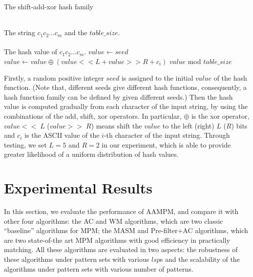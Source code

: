 \documentclass{article}
\begin{document}


\begin{algorithm}
  \caption{The \textsf{shift-add-xor} hash family}\scriptsize
  \label{alg:hash fun}
  \begin{algorithmic}[1]
    \REQUIRE ~~\\
    The string $c_1c_2 \dots c_m$ and the $table\_size$.  \\
    \ENSURE ~~\\
    The hash value of $c_1c_2 \dots c_m$.
    \STATE
    \STATE $value \leftarrow seed$
    \STATE $value \leftarrow value \oplus (value << L + value >> R + c_i)$
    \ENDFOR
    \RETURN $value$ mod $table\_size$
  \end{algorithmic}
\end{algorithm}

Firstly, a random positive integer $seed$ is assigned to the initial
$value$ of the hash function. (Note that, different seeds give
different hash functions, consequently, a hash function family can be
defined by given different seeds.) Then the hash value is computed
gradually from each character of the input string, by using the
combinations of the \textsf{add, shift, xor} operators. In particular,
$\oplus$ is the \textsf{xor} operator, $value << \;L$ ($value >> \;R$)
means shift the $value$ to the left (right) $L$ ($R$) bits and $c_i$
is the ASCII value of the $i$-th character of the input
string. Through testing, we set $L=5$ and $R=2$ in our experiment,
which is able to provide greater likelihood of a uniform distribution
of hash values.


\section{Experimental Results}
\label{sec:experiments}

In this section, we evaluate the performance of \textsf{AAMPM}, and
compare it with other four algorithms: the \textsf{AC} and \textsf{WM}
algorithms, which are two classic ``baseline'' algorithms for MPM; the
\textsf{MASM} and \textsf{Pre-filter+AC} algorithms, which are two
state-of-the art MPM algorithms with good efficiency in practically
matching. All these algorithms are evaluated in two aspects: the
robustness of these algorithms under pattern sets with various $lsp$s
and the scalability of the algorithms under pattern sets with various
number of patterns.
\end{document}
